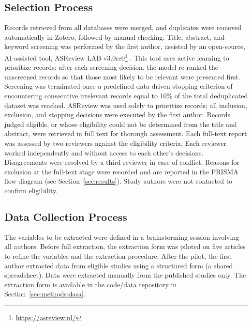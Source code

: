 \subsection{Selection Process}   

Records retrieved from all databases were merged, and duplicates were removed automatically in Zotero, followed by manual checking. Title, abstract, and keyword screening was performed by the first author, assisted by an open-source, AI-assisted tool, ASReview LAB v3.0rc0\footnote{\url{https://asreview.nl/}} \cite{vandeschoot2021asreview}. This tool uses active learning to prioritize records: after each screening decision, the model re-ranked the unscreened records so that those most likely to be relevant were presented first.  Screening was terminated once a predefined data-driven stopping criterion of encountering consecutive irrelevant records equal to 10\% of the total deduplicated dataset was reached. ASReview was used solely to prioritize records; all inclusion, exclusion, and stopping decisions were executed by the first author. Records judged eligible, or whose eligibility could not be determined from the title and abstract, were retrieved in full text for thorough assessment. Each full-text report was assessed by two reviewers against the eligibility criteria. Each reviewer worked independently and without access to each other's decisions. Disagreements were resolved by a third reviewer in case of conflict. Reasons for exclusion at the full-text stage were recorded and are reported in the PRISMA flow diagram (see Section~\ref{sec:results}). Study authors were not contacted to confirm eligibility.


\subsection{Data Collection Process}

The variables to be extracted were defined in a brainstorming session involving all authors. Before full extraction, the extraction form was piloted on five articles to refine the variables and the extraction procedure. After the pilot, the first author extracted data from eligible studies using a structured form (a shared spreadsheet). Data were extracted manually from the published studies only. The extraction form is available in the code/data repository in Section~\ref{sec:methods:dasa}.

